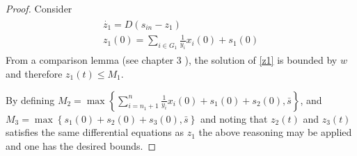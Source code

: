 \documentclass[3p,times]{article}
\begin{document}
\begin{proof}
	Consider  
	\begin{align}
	\label{z1} \begin{array}{l}
	\dot{z_1} =  D(s_{in} - z_1)\\
	z_1(0) = \sum \limits_{i \in G_1} \frac{1}{y_i}x_i(0) + s_1(0)
	\end{array} 
	\end{align}
	From a comparison lemma (see chapter 3 \cite{Khalil1996}), the solution of \eqref{z1} is bounded by $w$ and therefore $z_1(t) \leq M_1$.
	
	By defining $M_2 = \max\left \{ \displaystyle \sum \limits_{i=n_1 +1 }^{n} \frac{1}{y_i}x_i(0) + s_1(0) +s_2(0), \bar{s} \right\}$, and $M_3 =\max\left \{ s_1(0) +s_2(0) + s_3(0), \bar{s} \right\} $ and noting that $z_2(t)$ and $z_3(t)$ satisfies the same differential equations as $z_1$ the above reasoning may be applied and one has the desired bounds.
\end{proof}


\wellposedness*
\end{document}
